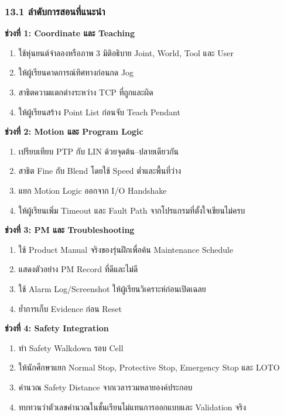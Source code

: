 \subsubsection{13.1 ลำดับการสอนที่แนะนำ}

\textbf{ช่วงที่ 1: Coordinate และ Teaching}

\begin{enumerate}
    \item ใช้หุ่นยนต์จำลองหรือภาพ 3 มิติอธิบาย Joint, World, Tool และ User
    \item ให้ผู้เรียนคาดการณ์ทิศทางก่อนกด Jog
    \item สาธิตความแตกต่างระหว่าง TCP ที่ถูกและผิด
    \item ให้ผู้เรียนสร้าง Point List ก่อนจับ Teach Pendant
\end{enumerate}

\textbf{ช่วงที่ 2: Motion และ Program Logic}

\begin{enumerate}
    \item เปรียบเทียบ PTP กับ LIN ด้วยจุดต้น–ปลายเดียวกัน
    \item สาธิต Fine กับ Blend โดยใช้ Speed ต่ำและพื้นที่ว่าง
    \item แยก Motion Logic ออกจาก I/O Handshake
    \item ให้ผู้เรียนเพิ่ม Timeout และ Fault Path จากโปรแกรมที่ตั้งใจเขียนไม่ครบ
\end{enumerate}

\textbf{ช่วงที่ 3: PM และ Troubleshooting}

\begin{enumerate}
    \item ใช้ Product Manual จริงของรุ่นฝึกเพื่อค้น Maintenance Schedule
    \item แสดงตัวอย่าง PM Record ที่ดีและไม่ดี
    \item ใช้ Alarm Log/Screenshot ให้ผู้เรียนวิเคราะห์ก่อนเปิดเฉลย
    \item ย้ำการเก็บ Evidence ก่อน Reset
\end{enumerate}

\textbf{ช่วงที่ 4: Safety Integration}

\begin{enumerate}
    \item ทำ Safety Walkdown รอบ Cell
    \item ให้นักศึกษาแยก Normal Stop, Protective Stop, Emergency Stop และ LOTO
    \item คำนวณ Safety Distance จากเวลารวมหลายองค์ประกอบ
    \item ทบทวนว่าตัวเลขคำนวณในชั้นเรียนไม่แทนการออกแบบและ Validation จริง
\end{enumerate}

